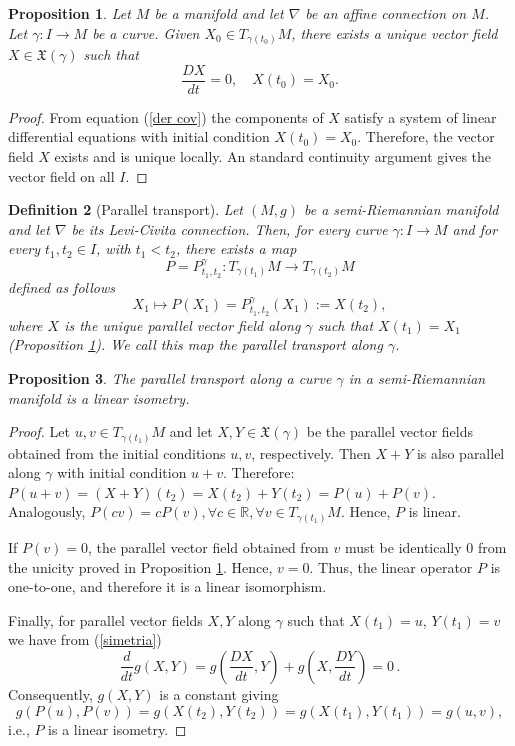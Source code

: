 \documentclass[11pt]{book}
\newtheorem{defi}{Definition}[chapter]
\newtheorem{pro}[defi]{Proposition}
\def\R{\mathbb R}
\def\x{\mathfrak X}
\begin{document}
\begin{pro}\label{campo vectores paralelo} 
	Let $M$ be a manifold and let $\nabla$ be an affine connection on $M$. Let $\gamma:I\to M$ be a curve. Given $X_0 \in T_{\gamma(t_0)}M$, there exists a unique vector field $X\in \x(\gamma)$ such that
	\[
	\frac{DX}{dt}=0, \quad X(t_0)=X_0.
	\]
\end{pro}
\begin{proof}
	From equation (\ref{der cov}) the components of $X$ satisfy a system of linear differential equations with initial condition $X(t_0)=X_0$. Therefore, the vector field $X$ exists and is unique locally. An standard continuity argument gives the vector field on all $I$.  
\end{proof}

\begin{defi}[Parallel transport]
	Let $(M,g)$ be a semi-Riemannian manifold and let $\nabla$ be its Levi-Civita connection. Then, for every curve $\gamma:I\to M$ and for every $t_1,t_2\in I$, with $t_1<t_2$, there exists a map
	\[
	P=P_{t_1,t_2}^\gamma : T_{\gamma(t_1)}M \longrightarrow T_{\gamma(t_2)}M
	\]
	defined as follows
	\[
	X_1 \longmapsto P(X_1)=P_{t_1,t_2}^\gamma(X_1):=X(t_2),
	\]
	where $X$ is the unique parallel vector field along $\gamma$ such that $X(t_1)=X_1$ (Proposition \ref{campo vectores paralelo}). We call this map the parallel transport along $\gamma$.
\end{defi}

\begin{pro}
	The parallel transport along a curve $\gamma$ in a semi-Riemannian manifold is a linear isometry.
\end{pro}
\begin{proof}
	Let $u,v\in T_{\gamma(t_1)}M$ and let $X,Y\in \x(\gamma)$ be the parallel vector fields obtained from the initial conditions $u,v$, respectively. Then $X+Y$ is also parallel along $\gamma$ with initial condition $u+v$. Therefore: $P(u+v)=(X+Y)(t_2)=X(t_2)+Y(t_2)=P(u)+P(v)$.
	Analogously, $P(cv)=cP(v), \forall c\in \R,\forall v\in T_{\gamma(t_1)}M$. Hence, $P$ is linear. 
	
	If $P(v)=0$, the parallel vector field obtained from $v$ must be identically $0$ from the unicity proved in Proposition \ref{campo vectores paralelo}. Hence, $v=0$. Thus, the linear operator $P$ is one-to-one, and therefore it is a linear isomorphism. 
	
	Finally, for parallel vector fields $X,Y$ along $\gamma$ such that $X(t_1)=u$, $Y(t_1)=v$ we have from (\ref{simetria})
	\[
	\frac{d}{dt} g(X,Y)=g\left(\frac{DX}{dt}, Y\right) + g\left(X,\frac{DY}{dt}\right)=0\,.
	\]
	Consequently, $g(X,Y)$ is a constant giving
	\[
	g(P(u),P(v))=g(X(t_2),Y(t_2))=g(X(t_1),Y(t_1))=g(u,v),
	\]
	i.e., $P$ is a linear isometry.
	
\end{proof}
\end{document}

